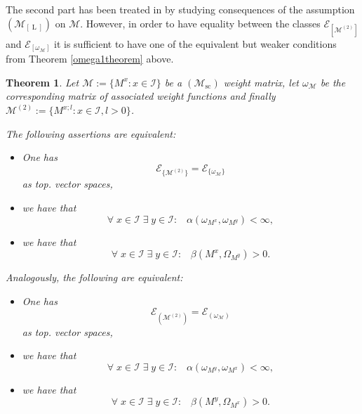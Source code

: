 \documentclass[10pt]{amsart}%
\numberwithin{equation}{section}
\theoremstyle{plain}
\newtheorem{theorem}[proposition]{Theorem}
\let\on=\operatorname
\begin{document}
The second part has been treated in \cite[Section 3.10]{testfunctioncharacterization} by studying consequences of the assumption $(\mathcal{M}_{[\on{L}]})$ on $\mathcal{M}$. However, in order to have equality between the classes $\mathcal{E}_{[\mathcal{M}^{(2)}]}$ and $\mathcal{E}_{[\omega_{\mathcal{M}}]}$ it is sufficient to have one of the equivalent but weaker conditions from Theorem \ref{omega1theorem} above.

\begin{theorem}\label{Thm311testfunc}
Let $\mathcal{M}:=\{M^x: x\in\mathcal{I}\}$ be a \hyperlink{Msc}{$(\mathcal{M}_{\on{sc}})$} weight matrix, let $\omega_{\mathcal{M}}$ be the corresponding matrix of associated weight functions and finally $\mathcal{M}^{(2)}:=\{M^{x;l}: x\in\mathcal{I}, l>0\}$.

The following assertions are equivalent:
\begin{itemize}
\item[$(i)$] One has
$$\mathcal{E}_{\{\mathcal{M}^{(2)}\}}=\mathcal{E}_{\{\omega_{\mathcal{M}}\}}$$
as top. vector spaces,

\item[$(ii)$] we have that
$$\forall\;x\in\mathcal{I}\;\exists\;y\in\mathcal{I}:\;\;\; \alpha(\omega_{M^x},\omega_{M^y})<\infty,$$

\item[$(iii)$] we have that
$$\forall\;x\in\mathcal{I}\;\exists\;y\in\mathcal{I}:\;\;\; \beta(M^x,\Omega_{M^y})>0.$$
\end{itemize}

Analogously, the following are equivalent:
\begin{itemize}
\item[$(i)$] One has $$\mathcal{E}_{(\mathcal{M}^{(2)})}=\mathcal{E}_{(\omega_{\mathcal{M}})}$$
as top. vector spaces,

\item[$(ii)$] we have that
$$\forall\;x\in\mathcal{I}\;\exists\;y\in\mathcal{I}:\;\;\; \alpha(\omega_{M^y},\omega_{M^x})<\infty,$$

\item[$(iii)$] we have that
$$\forall\;x\in\mathcal{I}\;\exists\;y\in\mathcal{I}:\;\;\; \beta(M^y,\Omega_{M^x})>0.$$
\end{itemize}
\end{theorem}
\end{document}
